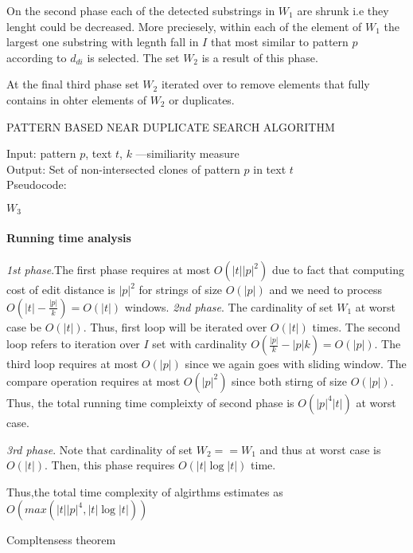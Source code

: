 On the second phase  each of the detected substrings in $W_{1}$ are shrunk i.e they lenght could be decreased.
More preciesely, within each of the element of $W_{1}$ the largest one substring with legnth fall in $I$ that most similar to pattern $p$ according to $d_{di}$ is selected.
The set $W_{2}$ is a result of this phase.

At the final third phase  set $W_{2}$ iterated over to remove elements that fully contains in ohter elements of $W_{2}$ or duplicates.


\begin{algorithm}[H]
\caption{PATTERN BASED NEAR DUPLICATE
SEARCH ALGORITHM}\cite{}
\label{alg:luciv}
Input: pattern $p$, text $t$, $k$ ---similiarity measure\\
Output: Set of non-intersected clones of pattern $p$ in text $t$\\
Pseudocode:
\begin{algorithmic}[1]
\ENDIF
\ENDFOR
{}

\ENDIF
\ENDFOR
\ENDFOR
{}
\ENDFOR


\ENDIF
\ENDFOR
\RETURN $W_3$

\end{algorithmic}
\end{algorithm}

\paragraph{Running time analysis}
\emph{1st phase}.The first phase requires at most  $O(|t||p|^2)$ due to fact
that computing cost of edit distance is $|p|^2$ for strings of size $O(|p|)$ and we need to process $O(|t|-\frac{|p|}{k})=O(|t|)$ windows.
\emph{2nd phase}. 
The cardinality of set $W_{1}$  at worst case be $O(|t|)$.
Thus, first loop will be iterated over $O(|t|)$ times.
The second loop refers to iteration over $I$ set with cardinality $O(\frac{|p|}{k}-|p|k) = O(|p|)$.
The third loop requires at most $O(|p|)$ since we again goes with sliding window.
The compare operation requires at most $O(|p|^2)$ since both
stirng of size $O(|p|)$.
Thus, the total running time compleixty of second phase is $O(|p|^4|t|)$ at worst case.

\emph{3rd phase}. 
Note that cardinality of set $W_{2}==W_{1}$ and thus at worst case is $O(|t|)$.
Then, this phase requires $O(|t| \log |t|)$ time. 

Thus,the total time complexity of algirthms estimates as 
$O(max(|t||p|^4,|t| \log|t|))$

\begin{theorem}\cite{Luciv}
Compltensess theorem
\end{theorem}

